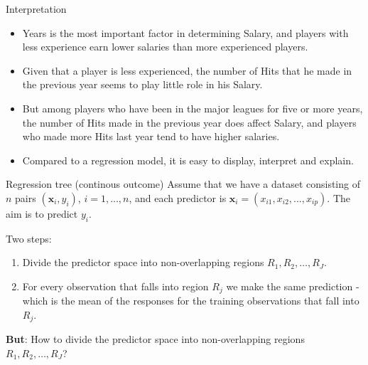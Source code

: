 \documentclass[
  10pt,
  ignorenonframetext,
]{beamer}
\providecommand{\tightlist}{%
  \setlength{\itemsep}{0pt}\setlength{\parskip}{0pt}}
\begin{document}
\begin{frame}
\begin{block}{Interpretation}
\protect\hypertarget{interpretation}{}
\(~\)

\begin{itemize}
\tightlist
\item
  Years is the most important factor in determining Salary, and players
  with less experience earn lower salaries than more experienced
  players.
\end{itemize}

\vspace{2mm}

\begin{itemize}
\tightlist
\item
  Given that a player is less experienced, the number of Hits that he
  made in the previous year seems to play little role in his Salary.
\end{itemize}

\vspace{2mm}

\begin{itemize}
\tightlist
\item
  But among players who have been in the major leagues for five or more
  years, the number of Hits made in the previous year does affect
  Salary, and players who made more Hits last year tend to have higher
  salaries.
\end{itemize}

\vspace{2mm}

\begin{itemize}
\tightlist
\item
  Compared to a regression model, it is easy to display, interpret and
  explain.
\end{itemize}
\end{block}
\end{frame}

\begin{frame}{Regression tree (continous outcome)}
\protect\hypertarget{regression-tree-continous-outcome}{}
Assume that we have a dataset consisting of \(n\) pairs
\((\boldsymbol{x}_i,y_i)\), \(i=1,\ldots,n\), and each predictor is
\({\boldsymbol{x}}_i=(x_{i1},x_{i2},...,x_{ip})\). The aim is to predict
\(y_i\).

\vspace{2mm}

Two steps:

\begin{enumerate}
\item
  Divide the predictor space into non-overlapping regions
  \(R_1,R_2,\ldots,R_J\).
\item
  For every observation that falls into region \(R_j\) we make the same
  prediction - which is the mean of the responses for the training
  observations that fall into \(R_j\).
\end{enumerate}

\vspace{2mm}

\textbf{But}: How to divide the predictor space into non-overlapping
regions \(R_1,R_2,\ldots,R_J\)?
\end{frame}
\end{document}
